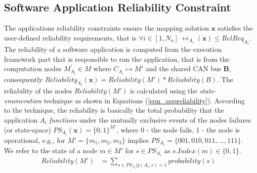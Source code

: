\subsection{Software Application Reliability Constraint}\label{subsec_reliability_constraint}
The applications reliability constraints ensure the mapping solution $\textbf{x}$ satisfies the user-defined reliability requirements, that is $ \forall i\in [1,N_a]\ \rel_{A_i}(\textbf{x})\leq RelReq_{A_i}$. 
The reliability of a software application is computed from the execution framework part that is responsible to run the application, that is from the computation nodes $M^{'}_{A_i}\in M$ where $C_{A_i}\mapsto M'$ and the shared CAN bus \textbf{B}, consequently $Reliability_{A_i}(\textbf{x})=Reliability(M')*Reliability(B)$. The reliability of the nodes $Reliability(M')$ is calculated using the \textit{state-enumeration} technique \cite{Lucet1999ExactReliability}  as shown in Equations (\ref{eqn_appreliability}). According to the technique, the reliability is basically the total probability that the application $A_i$ \textit{functions} under the mutually exclusive events of the nodes failures  (or state-space) $PS_{A_i}(\textbf{x})=\{0,1\}^{M'}$, where  0 - the node fails, 1 - the node is operational, e.g., for $M'=\{m_1,m_2,m_3\}$ implies $PS_{A_i}=\{001,010,011,...,111\}$. We refer to the state of a node $m\in M'$ for $s\in PS_{A_i}$ as $s.Index(m)\in\{0,1\}$. 
\begin{align}
\label{eqn_appreliability}
Reliability(M')&=\sum_{s\in PS_{A_i}|g(A_i, s)=1}probability(s)
\end{align}

